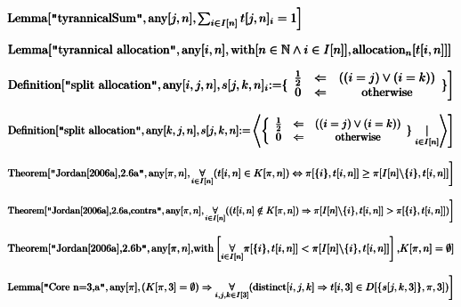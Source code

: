 \documentclass{article}
\begin{document}
\noindent\(\pmb{\text{Lemma}[\text{$\texttt{"}$tyrannicalSum$\texttt{"}$},\text{any}[j,n],}\\
\pmb{\left.\sum _{i\in I[n]} t[j,n]_i=1\right]}\)

\noindent\(\pmb{\text{Lemma}[\text{$\texttt{"}$tyrannical allocation$\texttt{"}$},\text{any}[i,n],\text{with}[n\in \mathbb{N}\land i\in I[n]],}\\
\pmb{\left.\text{allocation}_n[t[i,n]]\right] }\)

\noindent\(\pmb{\text{Definition}[\text{$\texttt{"}$split allocation$\texttt{"}$},\text{any}[i,j,n],}\\
\pmb{\left.s[j,k,n]_i\text{:=}\{
\begin{array}{ccc}
 \frac{1}{2} & \Leftarrow  & ((i=j )\lor ( i=k)) \\
 0 & \Leftarrow  & \text{otherwise}
\end{array}
\} \right]}\)

\noindent\(\pmb{\text{Definition}[\text{$\texttt{"}$split allocation$\texttt{"}$},\text{any}[k,j,n],}\\
\pmb{\left.s[j,k,n]\text{:=}\left\langle \left\{
\begin{array}{ccc}
 \frac{1}{2} & \Leftarrow  & ((i=j )\lor ( i=k)) \\
 0 & \Leftarrow  & \text{otherwise}
\end{array}
\}\right. \underset{i\in I[n]}{|}\right\rangle \right]}\)

\noindent\(\pmb{\text{Theorem}[\text{$\texttt{"}$Jordan[2006a],2.6a$\texttt{"}$},\text{any}[\pi ,n],}\\
\pmb{\left.\underset{i\in I[n]}{\forall }(t[i,n] \in  K[\pi ,n]) \Leftrightarrow  \pi [\{i\},t[i,n]]\geq  \pi [I[n]\backslash  \{i\},t[i,n]]\right]}\)

\noindent\(\pmb{\text{Theorem}[\text{$\texttt{"}$Jordan[2006a],2.6a,contra$\texttt{"}$},\text{any}[\pi ,n],}\\
\pmb{\left.\underset{i\in I[n]}{\forall }((t[i,n] \notin  K[\pi ,n]) \Rightarrow  \pi [I[n]\backslash  \{i\},t[i,n]]> \pi [\{i\},t[i,n]])\right]}\)

\noindent\(\pmb{\text{Theorem}[\text{$\texttt{"}$Jordan[2006a],2.6b$\texttt{"}$},\text{any}[\pi ,n],}\\
\pmb{\text{with}\left[\underset{i\in I[n]}{\forall }\pi [\{i\},t[i,n]]<\pi [I[n]\backslash  \{i\},t[i,n]]\right],}\\
\pmb{K[\pi ,n] = \emptyset ]}\)

\noindent\(\pmb{\text{Lemma}[\text{$\texttt{"}$Core n=3,a$\texttt{"}$}, \text{any}[\pi ],}\\
\pmb{\left.(K[\pi ,3]=\emptyset ) \Rightarrow  \underset{i,j,k\in I[3]}{\forall } (\text{distinct}[i,j,k]\Rightarrow t[i,3]\in  D[\{s[j,k,3]\},\pi
,3])\right]}\)
\end{document}
